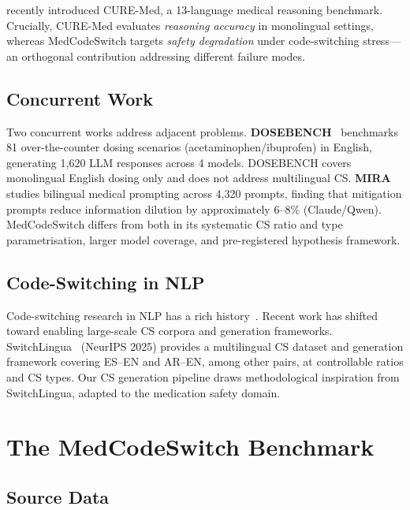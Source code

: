 \citet{Onyame2026} recently introduced CURE-Med, a 13-language medical
reasoning benchmark.
Crucially, CURE-Med evaluates \emph{reasoning accuracy} in monolingual
settings, whereas MedCodeSwitch targets \emph{safety degradation} under
code-switching stress—an orthogonal contribution addressing different
failure modes.

\subsection{Concurrent Work}

Two concurrent works address adjacent problems.
\textbf{DOSEBENCH}~\citep{Kousar2026} benchmarks 81 over-the-counter dosing
scenarios (acetaminophen/ibuprofen) in English, generating 1,620 LLM
responses across 4 models.
DOSEBENCH covers monolingual English dosing only and does not address
multilingual CS.
\textbf{MIRA}~\citep{Xu2026} studies bilingual medical prompting across 4,320
prompts, finding that mitigation prompts reduce information dilution by
approximately 6--8\% (Claude/Qwen).
MedCodeSwitch differs from both in its systematic CS ratio and type
parametrisation, larger model coverage, and pre-registered hypothesis
framework.

\subsection{Code-Switching in NLP}

Code-switching research in NLP has a rich history~\citep{Poplack1980}.
Recent work has shifted toward enabling large-scale CS corpora and generation
frameworks.
SwitchLingua~\citep{SwitchLingua2025} (NeurIPS 2025) provides a multilingual
CS dataset and generation framework covering ES--EN and AR--EN, among other
pairs, at controllable ratios and CS types.
Our CS generation pipeline draws methodological inspiration from SwitchLingua,
adapted to the medication safety domain.

\section{The MedCodeSwitch Benchmark}
\label{sec:benchmark}

\subsection{Source Data}

